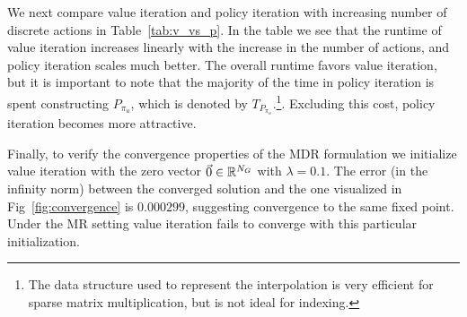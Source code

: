 We next compare value iteration and policy iteration with increasing number of discrete actions in Table~\ref{tab:v_vs_p}. In the table we see that the runtime of value iteration increases linearly with the increase in the number of actions, and policy iteration scales much better. The overall runtime favors value iteration, but it is important to note that the majority of the time in policy iteration is spent constructing $P_{\pi_u}$, which is denoted by $T_{P_{\pi_u}}$.\footnote{The data structure used to represent the interpolation is very efficient for sparse matrix multiplication, but is not ideal for indexing.}. Excluding this cost, policy iteration becomes more attractive.


Finally, to verify the convergence properties of the MDR formulation we initialize value iteration with the zero vector $\vec{0}\in \mathbb{R}^{N_G}$ with $\lambda=0.1$. The error (in the infinity norm) between the converged solution and the one visualized in Fig~\ref{fig:convergence} is $0.000299$, suggesting convergence to the same fixed point. Under the MR setting value iteration fails to converge with this particular initialization.


